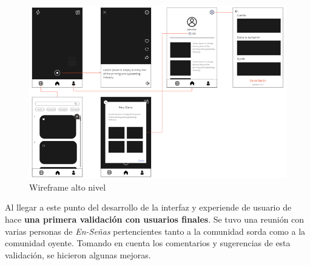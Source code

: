 \begin{itemize}
        \begin{figure}[H]
            \centering
            \includegraphics[width=1\linewidth]{figuras/fireframe_alta1.png}
            \caption{Wireframe alto nivel}
            \label{fig:enter-label}
        \end{figure}
    
\end{itemize}

Al llegar a este punto del desarrollo de la interfaz y experiende de usuario de hace\textbf{ una primera validación con usuarios finales}. Se tuvo una reunión con varias personas de \textit{En-Señas} pertencientes tanto a la comunidad sorda como a la comunidad oyente. Tomando en cuenta los comentarios y sugerencias de esta validación, se hicieron algunas mejoras.

